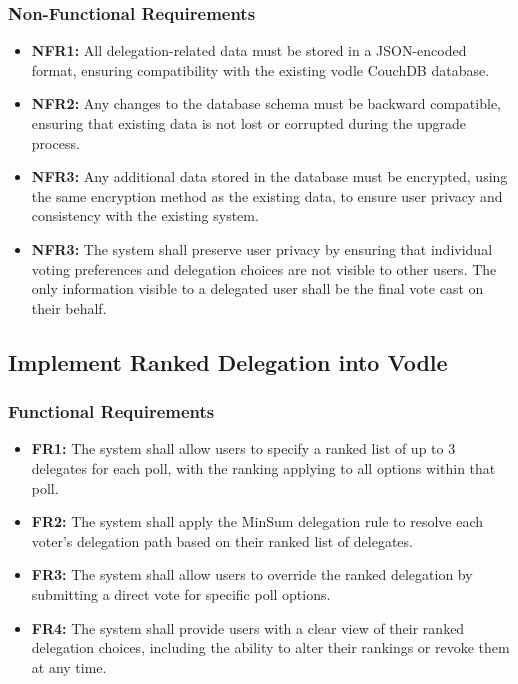 \subsubsection{Non-Functional Requirements}
\begin{itemize}
    \item \textbf{NFR1:} All delegation-related data must be stored in a JSON-encoded format, ensuring compatibility with the existing vodle CouchDB database.
    \item \textbf{NFR2:} Any changes to the database schema must be backward compatible, ensuring that existing data is not lost or corrupted during the upgrade process.
    \item \textbf{NFR3:} Any additional data stored in the database must be encrypted, using the same encryption method as the existing data, to ensure user privacy and consistency with the existing system.
    \item \textbf{NFR3:} The system shall preserve user privacy by ensuring that individual voting preferences and delegation choices are not visible to other users. The only information visible to a delegated user shall be the final vote cast on their behalf.
\end{itemize}

\subsection{Implement Ranked Delegation into Vodle}

\subsubsection{Functional Requirements}
\begin{itemize}
    \item \textbf{FR1:} The system shall allow users to specify a ranked list of up to 3 delegates for each poll, with the ranking applying to all options within that poll.
    
    \item \textbf{FR2:} The system shall apply the MinSum delegation rule to resolve each voter's delegation path based on their ranked list of delegates.
    
    \item \textbf{FR3:} The system shall allow users to override the ranked delegation by submitting a direct vote for specific poll options.
    
    \item \textbf{FR4:} The system shall provide users with a clear view of their ranked delegation choices, including the ability to alter their rankings or revoke them at any time.
\end{itemize}

